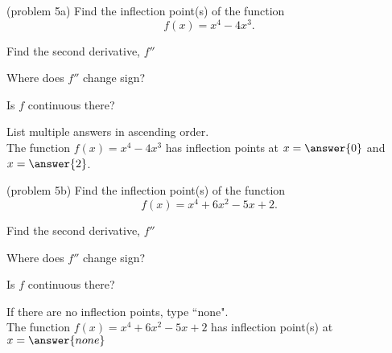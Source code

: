 \documentclass[handout]{ximera}
\begin{document}
\begin{example}[example 5]
\begin{image}
\end{image}

\end{example}

\begin{problem}(problem 5a)
  Find the inflection point(s) of the function
  \[
     f(x) = x^4 - 4x^3.
  \]
  
    \begin{hint}
      Find the second derivative, $f''$
    \end{hint}
    \begin{hint}
      Where does $f''$ change sign?
    \end{hint}
    \begin{hint}
      Is $f$ continuous there?
    \end{hint}  
		
		List multiple answers in ascending order.\\
		The function $f(x) = x^4 - 4x^3$ has inflection points at 
		$x =\answer{0}$ and $x = \answer{2}$.
		
	
\end{problem}


\begin{problem}(problem 5b)
  Find the inflection point(s) of the function
  \[
     f(x) = x^4 + 6x^2 - 5x + 2.
  \]
  
    \begin{hint}
      Find the second derivative, $f''$
    \end{hint}
    \begin{hint}
      Where does $f''$ change sign?
    \end{hint}
    \begin{hint}
      Is $f$ continuous there?
    \end{hint}  
		If there are no inflection points, type ``none".\\ 
		The function $f(x) = x^4 + 6x^2 - 5x + 2$ has inflection 
		point(s) at $x =\answer{none}$
	
\end{problem}
\end{document}
